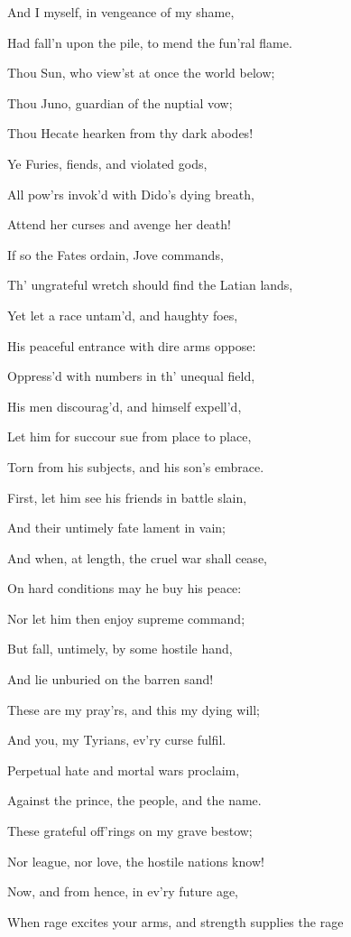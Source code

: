 And I myself, in vengeance of my shame,

Had fall’n upon the pile, to mend the fun’ral flame.

Thou Sun, who view’st at once the world below;

Thou Juno, guardian of the nuptial vow;

Thou Hecate hearken from thy dark abodes!

Ye Furies, fiends, and violated gods,

All pow’rs invok’d with Dido’s dying breath,

Attend her curses and avenge her death!

If so the Fates ordain, Jove commands,

Th’ ungrateful wretch should find the Latian lands,

Yet let a race untam’d, and haughty foes,

His peaceful entrance with dire arms oppose:

Oppress’d with numbers in th’ unequal field,

His men discourag’d, and himself expell’d,

Let him for succour sue from place to place,

Torn from his subjects, and his son’s embrace.

First, let him see his friends in battle slain,

And their untimely fate lament in vain;

And when, at length, the cruel war shall cease,

On hard conditions may he buy his peace:

Nor let him then enjoy supreme command;

But fall, untimely, by some hostile hand,

And lie unburied on the barren sand!

These are my pray’rs, and this my dying will;

And you, my Tyrians, ev’ry curse fulfil.

Perpetual hate and mortal wars proclaim,

Against the prince, the people, and the name.

These grateful off’rings on my grave bestow;

Nor league, nor love, the hostile nations know!

Now, and from hence, in ev’ry future age,

When rage excites your arms, and strength supplies the rage

